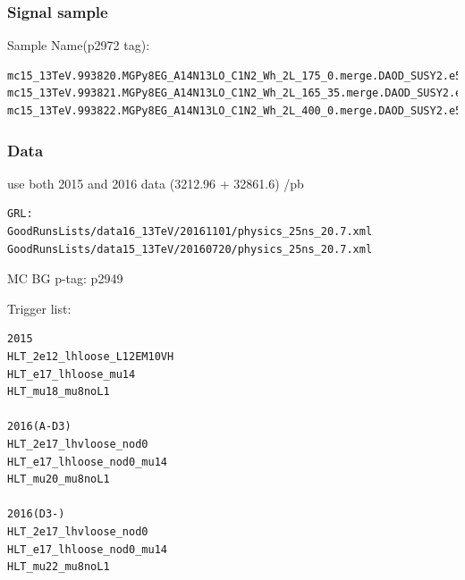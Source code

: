 \documentclass[mathserif,serif]{beamer}
\begin{document}
\begin{frame}[fragile]
\frametitle{Signal sample}
\small
Sample Name(p2972 tag):
\tiny
\begin{verbatim}
mc15_13TeV.993820.MGPy8EG_A14N13LO_C1N2_Wh_2L_175_0.merge.DAOD_SUSY2.e5678_a766_a821_r7676_p2949_p2972
mc15_13TeV.993821.MGPy8EG_A14N13LO_C1N2_Wh_2L_165_35.merge.DAOD_SUSY2.e5678_a766_a821_r7676_p2949_p2972
mc15_13TeV.993822.MGPy8EG_A14N13LO_C1N2_Wh_2L_400_0.merge.DAOD_SUSY2.e5678_a766_a821_r7676_p2949_p2972
\end{verbatim}
\end{frame}

\begin{frame}[fragile]
\frametitle{Data}
\small
use both 2015 and 2016 data (3212.96 + 32861.6) /pb
\tiny
\begin{verbatim}
GRL:
GoodRunsLists/data16_13TeV/20161101/physics_25ns_20.7.xml
GoodRunsLists/data15_13TeV/20160720/physics_25ns_20.7.xml
\end{verbatim}
\end{frame}

\begin{frame}{MC BG}
p-tag: p2949
\end{frame}

\begin{frame}[fragile]
\small
Trigger list:\\
\scriptsize
\begin{verbatim}
2015
HLT_2e12_lhloose_L12EM10VH
HLT_e17_lhloose_mu14
HLT_mu18_mu8noL1

2016(A-D3)
HLT_2e17_lhvloose_nod0
HLT_e17_lhloose_nod0_mu14
HLT_mu20_mu8noL1

2016(D3-)
HLT_2e17_lhvloose_nod0
HLT_e17_lhloose_nod0_mu14
HLT_mu22_mu8noL1
\end{verbatim}
\end{frame}
\end{document}
